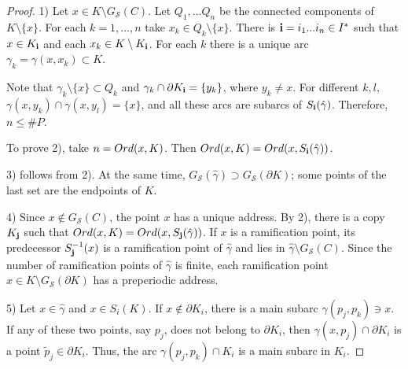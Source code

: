 \documentclass[10pt,a4paper]{amsart}
\newcommand{\eS}{{\mathcal S}}
\newcommand{\hga}{{\hat\gamma}}
\begin{document}
\begin{proof} 1) Let  $x \in K\setminus G_{\eS}(C)$.  Let $Q_1,... Q_n$ be the connected components of $K \setminus \{x\}$. 
For each $k=1,...,n$ take  $x_k \in Q_k\setminus\{x\}$. There is ${\bf {i}}=i_1...i_n\in I^*$ such that
$x \in K_{\bf {i}}$ and
each $x_k\in K\setminus K_{\bf {i}}$. For each $k$ there is a unique arc $\gamma_k=\gamma(x,x_k){\subset} K$.


Note that $\gamma_k\setminus\{x\}{\subset} Q_k$ and
$\gamma_k\cap {\partial} K_{\bf {i}}=\{y_k\}$, where $y_k\neq x$. For different $k,l$,  
$\gamma(x,y_k)\cap \gamma(x,y_l)=\{x\}$, and all these arcs are  subarcs of
$S_{\bf {i}}(\hga)$. Therefore, $n\le\#P$.


To prove 2), take
$n={\mathop{\rm Ord} \nolimits}(x,K)$. Then ${\mathop{\rm Ord} \nolimits}(x,K)={\mathop{\rm Ord} \nolimits}(x,S_{\bf {i}}(\hga))$.

3) follows from 2). At the same time, $G_{\eS}(\hat \gamma){\supset} G_{\eS}({\partial} K)$; some points of the last set are the endpoints of $K$.

4) Since  $x\notin  G_{{\eS}}(C)$, the point $x$ has a unique address. 
By 2), there is a copy $K_{\bf {j}}$ such that  ${\mathop{\rm Ord} \nolimits}(x,K)={\mathop{\rm Ord} \nolimits}(x,S_{\bf {j}}(\hga))$. %
If $x$ is a ramification point,  its predecessor $ S_{\bf {j}}^{-1}(x)$ 
is a ramification point of $\hga$ and lies in $\hga\setminus G_{{\eS}}(C)$.
Since the  number of  ramification points of $\hga$ is finite,  each ramification point $x\in K\setminus G_{{\eS}}({\partial} K)$ has a preperiodic address. 

5) Let $x\in\hga$ and $x\in S_i(K)$. If $x\notin {\partial} K_i$, there is a main subarc $\gamma(p_j,p_k)\ni x$. If any of these two points, say $p_j$, does not belong to ${\partial} K_i$, then $\gamma(x,p_j)\cap {\partial} K_i$ is a point  $\tilde p_j\in {\partial} K_i$. Thus, the arc $\gamma(p_j,p_k)\cap K_i$ is a  main subarc in  $K_i$. 
\end{proof}
\end{document}
